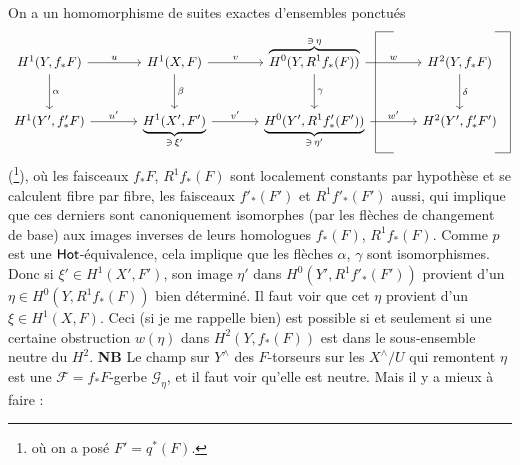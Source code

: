 \noindent On a un homomorphisme de suites exactes d'ensembles ponctués
\[
\begin{tikzcd}[column sep=large, row sep=large,
  every matrix/.append style={name=m},
  execute at end picture={
    \coordinate (lb) at ([xshift=0.4em]m-2-3.east);
    \coordinate (lt) at ([xshift=1.8em]m-2-3.east);
    \draw (lt |- m-1-3.north) -- (lb |- m-1-3.north) -- (lb |- m-2-3.south) -- (lt |- m-2-3.south);
    \coordinate (rb) at ([xshift=0.6em]m-2-4.east);
    \coordinate (rt) at ([xshift=-0.6em]m-2-4.east);
    \draw (rt |- m-1-3.north) -- (rb |- m-1-3.north) -- (rb |- m-2-3.south) -- (rt |- m-2-3.south);
  }]
H^1(Y, f_*F) \arrow[r, "u"] \arrow[d, "\alpha"] & H^1(X,F) \arrow[r, "v"] \arrow[d, "\beta"] & \overbrace{H^0(Y, R^1 f_*(F))}^{\ni\, \eta} \arrow[r, "w"] \arrow[d, "\gamma"] & H^2(Y, f_*F) \arrow[d, "\delta"] \\
H^1(Y', f'_*F) \arrow[r, "u'"] & \underbrace{H^1(X', F')}_{\ni\, \xi'} \arrow[r, "v'"] & \underbrace{H^0(Y', R^1 f'_*(F'))}_{\ni\, \eta'} \arrow[r, "w'"] & H^2(Y', f'_*F') %
\end{tikzcd}
\]
(\footnote{où on a posé $F' = q^*(F)$.}), où les faisceaux $f_*F$, $R^1 f_*(F)$ sont localement constants par hypothèse et se calculent fibre par fibre, les faisceaux $f'_*(F')$ et $R^1 f'_*(F')$ aussi, qui implique que ces derniers sont
canoniquement isomorphes (par les flèches de changement de base) aux images inverses de leurs homologues $f_*(F)$, $R^1 f_*(F)$. Comme $p$ est une $\mathsf{Hot}$-équivalence, cela implique que les flèches $\alpha$, $\gamma$ sont isomorphismes. Donc si $\xi' \in H^1(X', F')$, son image $\eta'$ dans $H^0(Y', R^1 f'_*(F'))$ provient d'un $\eta \in H^0(Y, R^1 f_*(F))$ bien déterminé. Il faut voir que cet $\eta$ provient d'un $\xi \in H^1(X,F)$. Ceci (si je me rappelle bien) est possible si et seulement si une certaine obstruction $w(\eta)$ dans $H^2(Y, f_*(F))$ est dans le sous-ensemble neutre du $H^2$. \textbf{NB} Le champ sur $Y^\wedge$ des $F$-torseurs sur les $X^\wedge/U$ qui remontent $\eta$ est une $\mathcal{F} = f_*F$-gerbe $\mathcal{G}_\eta$, et il faut voir qu'elle est neutre. Mais il y a mieux à faire :


